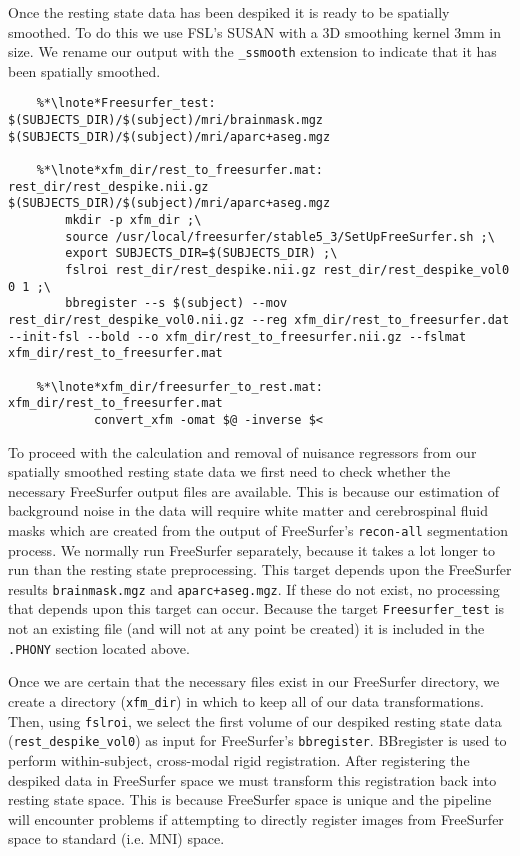  Once the resting state data has been despiked it is ready to be spatially smoothed. To do this we use FSL's SUSAN with a 3D smoothing kernel 3mm in size. We rename our output with the  \texttt{_ssmooth} extension to indicate that it has been spatially smoothed.

\begin{lstlisting}
	%*\lnote*Freesurfer_test: $(SUBJECTS_DIR)/$(subject)/mri/brainmask.mgz $(SUBJECTS_DIR)/$(subject)/mri/aparc+aseg.mgz

	%*\lnote*xfm_dir/rest_to_freesurfer.mat: rest_dir/rest_despike.nii.gz $(SUBJECTS_DIR)/$(subject)/mri/aparc+aseg.mgz
		mkdir -p xfm_dir ;\
		source /usr/local/freesurfer/stable5_3/SetUpFreeSurfer.sh ;\
		export SUBJECTS_DIR=$(SUBJECTS_DIR) ;\
		fslroi rest_dir/rest_despike.nii.gz rest_dir/rest_despike_vol0 0 1 ;\
		bbregister --s $(subject) --mov rest_dir/rest_despike_vol0.nii.gz --reg xfm_dir/rest_to_freesurfer.dat --init-fsl --bold --o xfm_dir/rest_to_freesurfer.nii.gz --fslmat xfm_dir/rest_to_freesurfer.mat

	%*\lnote*xfm_dir/freesurfer_to_rest.mat: xfm_dir/rest_to_freesurfer.mat
			convert_xfm -omat $@ -inverse $<
\end{lstlisting}

\lnum{11} To proceed with the calculation and removal of nuisance regressors from our spatially smoothed resting state data we first need to check whether the necessary FreeSurfer output files are available. This is because our estimation of background noise in the data will require white matter and cerebrospinal fluid masks which are created from the output of FreeSurfer's \texttt{recon-all} segmentation process. We normally run FreeSurfer separately, because it takes a lot longer to run than the resting state preprocessing. This target depends upon the FreeSurfer results \texttt{brainmask.mgz} and \texttt{aparc+aseg.mgz}. If these do not exist, no processing that depends upon this target can occur. Because the target \texttt{Freesurfer_test} is not an existing file (and will not at any point be created) it is included in the \texttt{.PHONY} section located above.

\lnum{12} Once we are certain that the necessary files exist in our FreeSurfer directory, we create a directory (\texttt{xfm_dir}) in which to keep all of our data transformations. Then, using \texttt{fslroi}, we select the first volume of our despiked resting state data (\texttt{rest_despike_vol0}) as input for FreeSurfer's \texttt{bbregister}. BBregister is used to perform within-subject, cross-modal rigid registration.  After registering the despiked data in FreeSurfer space we must transform this registration back into resting state space. This is because FreeSurfer space is unique and the pipeline will encounter problems if attempting to directly register images from FreeSurfer space to standard (i.e. MNI) space.

